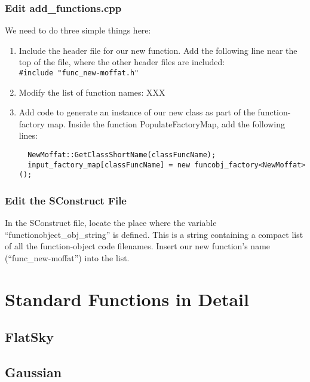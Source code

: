 \documentclass[10pt]{article}
\begin{document}
\subsubsection{Edit add\_functions.cpp}

We need to do three simple things here:
\begin{enumerate}
\item Include the header file for our new function. Add the following line near
the top of the file, where the other header files are included:\\
\texttt{\#include "func\_new-moffat.h"}

\item Modify the list of function names: XXX

\item Add code to generate an instance of our new class as part of the
function-factory map. Inside the function PopulateFactoryMap, add the following lines:
\begin{verbatim}
  NewMoffat::GetClassShortName(classFuncName);
  input_factory_map[classFuncName] = new funcobj_factory<NewMoffat>();
\end{verbatim}

\end{enumerate}



\subsubsection{Edit the SConstruct File}

In the SConstruct file, locate the place where the variable
``functionobject\_obj\_string'' is defined. This is a string containing
a compact list of all the function-object code filenames. Insert our new
function's name (``func\_new-moffat'') into the list.










\appendix
\section{Standard Functions in Detail}\label{app:functions}

\subsection{FlatSky}

\subsection{Gaussian}
\end{document}
